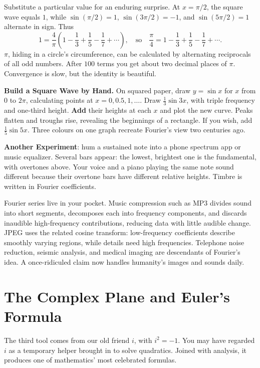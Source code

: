 Substitute a particular value for an enduring surprise. At $x=\pi/2$, the square wave equals $1$, while $\sin(\pi/2)=1$, $\sin(3\pi/2)=-1$, and $\sin(5\pi/2)=1$ alternate in sign. Thus
\[
1=\frac{4}{\pi}\left(1-\frac13+\frac15-\frac17+\cdots\right),
\quad\text{so}\quad
\frac{\pi}{4}=1-\frac13+\frac15-\frac17+\cdots .
\]
$\pi$, hiding in a circle's circumference, can be calculated by alternating reciprocals of all odd numbers. After $100$ terms you get about two decimal places of $\pi$. Convergence is slow, but the identity is beautiful.

\begin{shiyan}
\textbf{Build a Square Wave by Hand.} On squared paper, draw $y=\sin x$ for $x$ from $0$ to $2\pi$, calculating points at $x=0, 0.5, 1, \dots$. Draw $\frac{1}{3}\sin 3x$, with triple frequency and one-third height. \textbf{Add} their heights at each $x$ and plot the new curve. Peaks flatten and troughs rise, revealing the beginnings of a rectangle. If you wish, add $\frac{1}{5}\sin 5x$. Three colours on one graph recreate Fourier's view two centuries ago.

\textbf{Another Experiment}: hum a sustained note into a phone spectrum app or music equalizer. Several bars appear: the lowest, brightest one is the fundamental, with overtones above. Your voice and a piano playing the same note sound different because their overtone bars have different relative heights. Timbre is written in Fourier coefficients.
\end{shiyan}

\begin{lianjie}
Fourier series live in your pocket. Music compression such as MP3 divides sound into short segments, decomposes each into frequency components, and discards inaudible high-frequency contributions, reducing data with little audible change. JPEG uses the related cosine transform: low-frequency coefficients describe smoothly varying regions, while details need high frequencies. Telephone noise reduction, seismic analysis, and medical imaging are descendants of Fourier's idea. A once-ridiculed claim now handles humanity's images and sounds daily.
\end{lianjie}

\section{The Complex Plane and Euler's Formula}

The third tool comes from our old friend $i$, with $i^2=-1$. You may have regarded $i$ as a temporary helper brought in to solve quadratics. Joined with analysis, it produces one of mathematics' most celebrated formulas.

